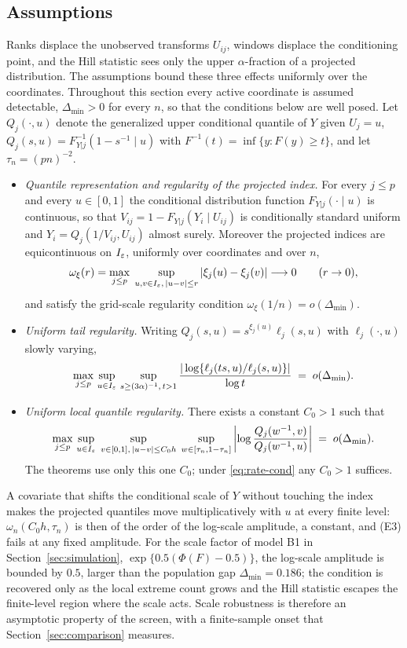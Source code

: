 \subsection{Assumptions}

Ranks displace the unobserved transforms $U_{ij}$, windows displace the
conditioning point, and the Hill statistic sees only the upper
$\alpha$-fraction of a projected distribution. The assumptions bound these
three effects uniformly over the coordinates. Throughout this section
every active coordinate is assumed detectable, $\Delta_{\min}>0$ for
every $n$, so that the conditions below are well posed. Let
$Q_j(\cdot,u)$ denote the generalized upper conditional quantile of $Y$
given $U_j=u$, $Q_j(s,u)=F_{Y|j}^{-1}(1-s^{-1}\mid u)$ with
$F^{-1}(t)=\inf\{y:F(y)\ge t\}$, and let $\tau_n=(pn)^{-2}$.

\begin{itemize}
\item[(E1)] \emph{Quantile representation and regularity of the projected
index.} For every $j\le p$ and every $u\in[0,1]$ the conditional
distribution function $F_{Y|j}(\cdot\mid u)$ is continuous, so that
$V_{ij}=1-F_{Y|j}(Y_i\mid U_{ij})$ is conditionally standard uniform and
$Y_i=Q_j(1/V_{ij},U_{ij})$ almost surely. Moreover the projected indices
are equicontinuous on $I_\varepsilon$, uniformly over coordinates and over $n$,
\[
 \omega_\xi(r)=\max_{j\le p}\;
 \sup_{u,v\in I_\varepsilon,\,|u-v|\le r}|\xi_j(u)-\xi_j(v)|
 \longrightarrow0\qquad(r\to0),
\]
and satisfy the grid-scale regularity condition
$\omega_\xi(1/n)=o(\Delta_{\min})$.
\item[(E2)] \emph{Uniform tail regularity.} Writing
$Q_j(s,u)=s^{\xi_j(u)}\ell_j(s,u)$ with $\ell_j(\cdot,u)$ slowly varying,
\[
 \max_{j\le p}\,\sup_{u\in I_\varepsilon}\,
 \sup_{s\ge(3\alpha)^{-1},\,t>1}
 \frac{|\log\{\ell_j(ts,u)/\ell_j(s,u)\}|}{\log t}
 \;=\;o(\Delta_{\min}).
\]
\item[(E3)] \emph{Uniform local quantile regularity.} There exists a
constant $C_0>1$ such that
\[
 \max_{j\le p}\,
 \sup_{u\in I_\varepsilon}\;
 \sup_{v\in[0,1],\,|u-v|\le C_0h}\;
 \sup_{w\in[\tau_n,1-\tau_n]}
 \left|\log\frac{Q_j(w^{-1},v)}{Q_j(w^{-1},u)}\right|
 \;=\;o(\Delta_{\min}).
\]
The theorems use only this one $C_0$; under \eqref{eq:rate-cond} any
$C_0>1$ suffices.
\end{itemize}

\begin{remark}\label{rem:scale}
A covariate that shifts the conditional scale of $Y$ without touching
the index makes the projected quantiles move multiplicatively with $u$
at every finite level: $\omega_n(C_0h,\tau_n)$ is then of the order of
the log-scale amplitude, a constant, and (E3) fails at any fixed
amplitude. For the scale factor of model B1 in
Section~\ref{sec:simulation}, $\exp\{0.5(\Phi(F)-0.5)\}$, the log-scale
amplitude is bounded by $0.5$, larger than the population gap
$\Delta_{\min}=0.186$; the condition is recovered only as the local
extreme count grows and the Hill statistic escapes the finite-level
region where the scale acts. Scale robustness is therefore an
asymptotic property of the screen, with a finite-sample onset that
Section~\ref{sec:comparison} measures.
\end{remark}

